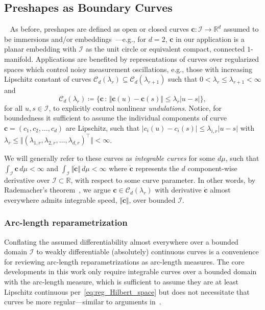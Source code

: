 \documentclass[pdflatex,iicol]{sn-jnl}%
\theoremstyle{thmstyleone}%
\theoremstyle{thmstyletwo}%
\theoremstyle{thmstylethree}%
\begin{document}
\subsection{Preshapes as Boundary Curves}~\label{subsec:preshapes}
As before, preshapes are defined as open or closed curves $\boldsymbol{c}:\mathcal{I} \rightarrow \mathbb{R}^d$ assumed to be immersions and/or embeddings~\cite{micheli2013matrix,bauer2014overview,srivastava2010shape,mumford2006riemannian,younes2008metric,hartman2023elastic}---e.g., for $d=2$, $\boldsymbol{c}$ in our application is a planar embedding with $\mathcal{I}$ as the unit circle or equivalent compact, connected $1$-manifold. Applications are benefited by representations of curves over regularized spaces which control noisy measurement oscillations, e.g., those with increasing Lipschitz constant of curves $\mathcal{C}_d(\lambda_r) \subseteq \mathcal{C}_d(\lambda_{r+1})$ such that $0<\lambda_r \leq \lambda_{r+1}<\infty$ and
        \begin{equation}\label{eq:reg_Hilbert_space}
             \mathcal{C}_d(\lambda_r) \coloneqq \lbrace \boldsymbol{c} \,:\, \Vert \boldsymbol{c}(u) - \boldsymbol{c}(s)\Vert \leq \lambda_r\vert u - s\vert\rbrace,
        \end{equation}
for all $u,s\in \mathcal{I}$, to explicitly control nonlinear \emph{undulations}. Notice, for boundedness it sufficient to assume the individual components of curve $\boldsymbol{c} = (c_1, c_2, \dots, c_d)$ are Lipschitz, such that $\vert c_i(u) - c_i(s) \vert \leq \lambda_{i,r}\vert u - s\vert$ with $\lambda_r \leq \Vert (\lambda_{1,r}, \lambda_{2,r},\dots, \lambda_{d,r})^\top\Vert <\infty$.

We will generally refer to these curves as \emph{integrable curves} for some $d\mu$, such that $\int_{\mathcal{I}} \boldsymbol{c} \,d\mu < \infty$ and $\int_{\mathcal{I}} \Vert \dot{\boldsymbol{c}} \Vert\, d\mu < \infty$ where $\dot{\boldsymbol{c}}$ represents the $d$ component-wise derivative over $\mathcal{I} \subset \mathbb{R}$, with respect to some curve parameter. In other words, by Rademacher's theorem~\cite{rudin1987real}, we argue $\boldsymbol{c} \in \mathcal{C}_d(\lambda_r)$ with derivative $\dot{\boldsymbol{c}}$ almost everywhere admits integrable speed, $\Vert \dot{\boldsymbol{c}}\Vert$, over bounded $\mathcal{I}$.

\subsubsection{Arc-length reparametrization}
Conflating the assumed differentiability almost everywhere over a bounded domain $\mathcal{I}$ to weakly differentiable (absolutely) continuous curves is a convenience for reviewing arc-length reparametrizations as arc-length measures. The core developments in this work only require integrable curves over a bounded domain with the arc-length measure, which is sufficient to assume they are at least Lipschitz continuous per~\eqref{eq:reg_Hilbert_space} but does not necessitate that curves be more regular---similar to arguments in~\cite{srivastava2010shape,bruveris2016optimal}.
\end{document}

